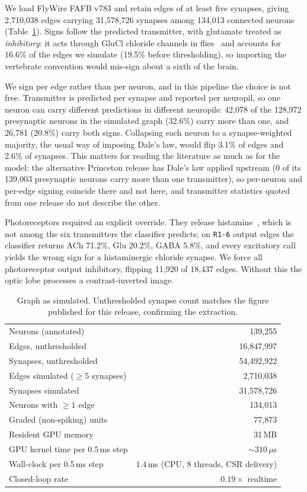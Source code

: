 \documentclass[10pt,twoside]{article}
\newcommand{\cell}[1]{\texttt{#1}}
\begin{document}
We load FlyWire FAFB v783 and retain edges of at least five synapses, giving
2{,}710{,}038 edges carrying 31{,}578{,}726 synapses among 134{,}013 connected
neurons (Table~\ref{tab:graph}). Signs follow the predicted transmitter, with
glutamate treated as \emph{inhibitory}: it acts through GluCl chloride
channels in flies~\citep{cleland1996} and accounts for 16.6\% of the edges we
simulate (19.5\% before thresholding), so importing the vertebrate convention
would mis-sign about a sixth of the brain.

We sign per edge rather than per neuron, and in this pipeline the choice is not
free. Transmitter is predicted per synapse and reported per neuropil, so one
neuron can carry different predictions in different neuropils: 42{,}078 of the
128{,}972 presynaptic neurons in the simulated graph (32.6\%) carry more than
one, and 26{,}781 (20.8\%) carry both signs. Collapsing each neuron to a
synapse-weighted majority, the usual way of imposing Dale's law, would
flip 3.1\% of edges and 2.6\% of synapses. This matters for reading the
literature as much as for the model: the alternative Princeton release has
Dale's law applied upstream (0 of its 139{,}003 presynaptic neurons carry more
than one transmitter), so per-neuron and per-edge signing coincide there and
not here, and transmitter statistics quoted from one release do not describe
the other.

Photoreceptors required an explicit override. They release
histamine~\citep{hardie1989}, which is not among the six transmitters the
classifier predicts; on \cell{R1-6} output edges the classifier returns ACh
71.2\%, Glu 20.2\%, GABA 5.8\%, and every excitatory call yields the wrong sign
for a histaminergic chloride synapse. We force all photoreceptor output
inhibitory, flipping 11{,}920 of 18{,}437 edges. Without this the optic lobe processes a
contrast-inverted image.

\begin{table}[t]\centering\small
\caption{Graph as simulated. Unthresholded synapse count matches the figure
published for this release, confirming the extraction.}
\label{tab:graph}
\begin{tabular}{lr}
\toprule
Neurons (annotated) & 139{,}255\\
Edges, unthresholded & 16{,}847{,}997\\
Synapses, unthresholded & 54{,}492{,}922\\
\midrule
Edges simulated ($\geq5$ synapses) & 2{,}710{,}038\\
Synapses simulated & 31{,}578{,}726\\
Neurons with $\geq1$ edge & 134{,}013\\
Graded (non-spiking) units & 77{,}873\\
\midrule
Resident GPU memory & 31\,MB\\
GPU kernel time per 0.5\,ms step & ${\sim}310\,\mu$s\\
Wall-clock per 0.5\,ms step & $1.4$\,ms (CPU, 8 threads, CSR delivery)\\
Closed-loop rate & $0.19\times$ realtime\\
\bottomrule
\end{tabular}
\end{table}
\end{document}
